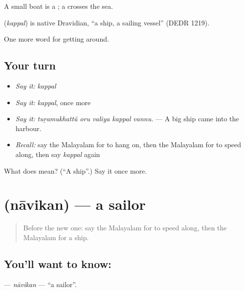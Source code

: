 A small boat is a ; a  crosses the sea.

\begin{cousinweb}
\textbf{} (\emph{kappal}) is native Dravidian, \textquotedblleft{}a ship, a sailing vessel\textquotedblright{} (DEDR 1219).
\end{cousinweb}

\begin{grammarlens}[title={What you've built}]
One more word for getting around.
\end{grammarlens}

\subsection*{Your turn}
\begin{itemize}
\raggedright
  \item \emph{Say it:} \emph{kappal}
  \item \emph{Say it:} \emph{kappal}, once more
  \item \emph{Say it:} \emph{tuṟamukhattŭ oru valiya kappal vannu.} — A big ship came into the harbour.
  \item \emph{Recall:} say the Malayalam for to hang on, then the Malayalam for to speed along, then say \emph{kappal} again
\end{itemize}

\begin{tcolorbox}[breakable,colback=teal!4,colframe=teal!35!black,title={Before you move on}]
What does  mean? (\textquotedblleft{}A ship\textquotedblright{}.) Say it once more.
\end{tcolorbox}
\section[\texorpdfstring{\ml{നാവികൻ} (nāvikan)}{നാവികൻ (nāvikan)}]{ (nāvikan) — a sailor}

\label{lesson:ML-C475-navikan}



\begin{quote}
Before the new one: say the Malayalam for to speed along, then the Malayalam for a ship.
\end{quote}

\subsection*{You'll want to know: }
\textbf{} — \emph{nāvikan} — \textquotedblleft{}a sailor\textquotedblright{}.

